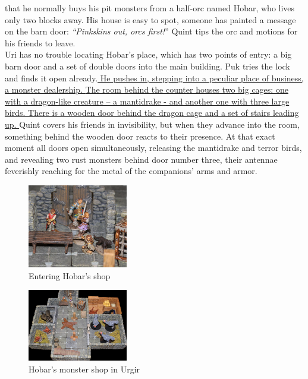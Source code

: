 that he normally buys his pit monsters from a half-orc named Hobar, who lives only two blocks away. His house is easy to spot, someone has painted a message on the barn door: {\itshape``Pinkskins out, orcs first!}'' Quint tips the orc and motions for his friends to leave.\\

Uri has no trouble locating Hobar's place, which has two points of entry: a big barn door and a set of double doors into the main building. Puk tries the lock and finds it open already.\hyperref[fig:Entering-Hobar-s-shop-591946639]{ He pushes in, stepping into a peculiar place of business, a monster dealership. }  \hyperref[fig:Hobar-s-monster-shop-in-Urgir-591945961]{ The room behind the counter houses two big cages: one with a dragon-like creature -- a mantidrake - and another one with three large birds. There is a wooden door behind the dragon cage and a set of stairs leading up. } Quint covers his friends in invisibility, but when they advance into the room, something behind the wooden door reacts to their presence. At that exact moment all doors open simultaneously, releasing the mantidrake and terror birds, and revealing two rust monsters behind door number three, their antennae feverishly reaching for the metal of the companions' arms and armor. \\

\begin{figure}[h]
	\centering
	\includegraphics[width=0.39\textwidth]{images/Entering-Hobar-s-shop-591946639.jpg}
	\caption{Entering Hobar's shop}
	\label{fig:Entering-Hobar-s-shop-591946639}
\end{figure}

\begin{figure}[h]
	\centering
	\includegraphics[width=0.39\textwidth]{images/Hobar-s-monster-shop-in-Urgir-591945961.jpg}
	\caption{Hobar's monster shop in Urgir}
	\label{fig:Hobar-s-monster-shop-in-Urgir-591945961}
\end{figure}


